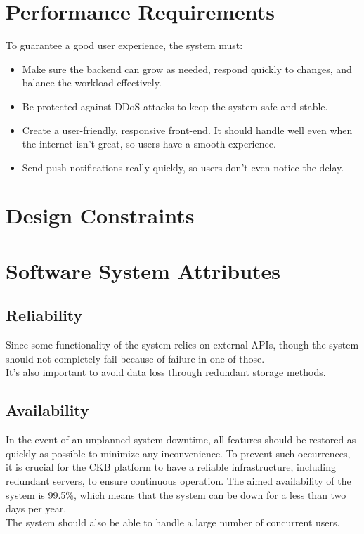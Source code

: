 \section{Performance Requirements}
To guarantee a good user experience, the system must:

\begin{itemize}
    \item Make sure the backend can grow as needed, respond quickly to changes, and balance the workload effectively.
    \item Be protected against DDoS attacks to keep the system safe and stable.
    \item Create a user-friendly, responsive front-end. It should handle well even when the internet isn't great, so users have a smooth experience.
    \item Send push notifications really quickly, so users don't even notice the delay.
\end{itemize}

{\color{red}\section{Design Constraints}}

\section{Software System Attributes}
\subsection{Reliability}
Since some functionality of the system relies on external APIs, though the system should not completely fail because of failure in one of those.\\
It's also important to avoid data loss through redundant storage methods.

\subsection{Availability}
In the event of an unplanned system downtime, all features should be restored as quickly as possible to minimize any inconvenience. To prevent such occurrences, it is crucial for the CKB platform to have a reliable infrastructure, including redundant servers, to ensure continuous operation.
The aimed availability of the system is 99.5\%, which means that the system can be down for a less than two days per year.\\
The system should also be able to handle a large number of concurrent users.

